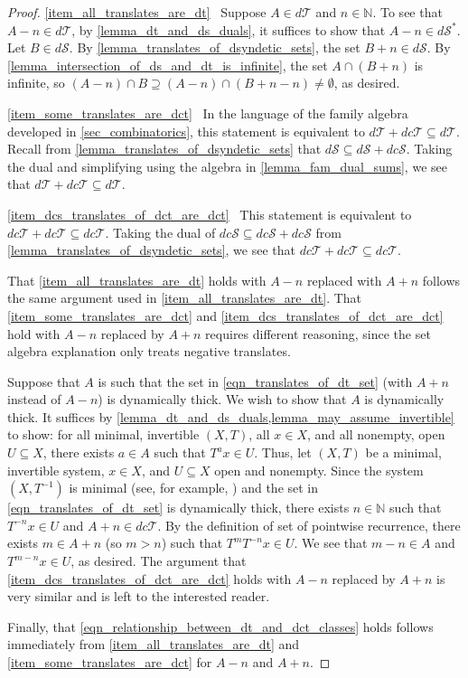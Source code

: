 \documentclass[letter,11pt]{article}
\theoremstyle{plain}
\theoremstyle{definition}
\theoremstyle{plain}
\theoremstyle{plain}
\numberwithin{equation}{section}
\newcommand{\N}{\mathbb{N}}
\newcommand{\dsyndetic}{d\mathcal{S}}
\newcommand{\dthick}{d\mathcal{T}}
\newcommand{\dcsyndetic}{dc\mathcal{S}}
\newcommand{\dcthick}{dc\mathcal{T}}
\begin{document}
\begin{proof}
    \eqref{item_all_translates_are_dt} \ Suppose $A \in \dthick$ and $n \in \N$. To see that $A - n \in \dthick$, by \cref{lemma_dt_and_ds_duals}, it suffices to show that $A-n \in \dsyndetic^*$.  Let $B \in \dsyndetic$.  By \cref{lemma_translates_of_dsyndetic_sets}, the set $B + n \in \dsyndetic$.  By \cref{lemma_intersection_of_ds_and_dt_is_infinite}, the set $A \cap (B+n)$ is infinite, so $(A-n) \cap B \supseteq (A-n) \cap (B+n - n) \neq \emptyset$, as desired.

    \eqref{item_some_translates_are_dct} \ In the language of the family algebra developed in \cref{sec_combinatorics}, this statement is equivalent to $\dthick + \dcthick \subseteq \dthick$.  Recall from \cref{lemma_translates_of_dsyndetic_sets} that $\dsyndetic \subseteq \dsyndetic + \dcsyndetic$. Taking the dual and simplifying using the algebra in \cref{lemma_fam_dual_sums}, we see that $\dthick + \dcthick \subseteq \dthick$.

    \eqref{item_dcs_translates_of_dct_are_dct} \ This statement is equivalent to $\dcthick + \dcthick \subseteq \dcthick$. Taking the dual of $\dcsyndetic \subseteq \dcsyndetic + \dcsyndetic$ from \cref{lemma_translates_of_dsyndetic_sets}, we see that $\dcthick + \dcthick \subseteq \dcthick$.
    
    That \eqref{item_all_translates_are_dt} holds with $A-n$ replaced with $A+n$ follows the same argument used in \eqref{item_all_translates_are_dt}.  That \eqref{item_some_translates_are_dct} and \eqref{item_dcs_translates_of_dct_are_dct} hold with $A-n$ replaced by $A+n$ requires different reasoning, since the set algebra explanation only treats negative translates.

    Suppose that $A$ is such that the set in \eqref{eqn_translates_of_dt_set} (with $A+n$ instead of $A-n$) is dynamically thick.  We wish to show that $A$ is dynamically thick.  It suffices by \cref{lemma_dt_and_ds_duals,lemma_may_assume_invertible} to show: for all minimal, invertible $(X,T)$, all $x \in X$, and all nonempty, open $U \subseteq X$, there exists $a \in A$ such that $T^a x \in U$.  Thus, let $(X,T)$ be a minimal, invertible system, $x \in X$, and $U \subseteq X$ open and nonempty.  Since the system $(X,T^{-1})$ is minimal (see, for example, \cite[Lemma 2.7]{glasscock_koutsogiannis_richter_2019}) and the set in \eqref{eqn_translates_of_dt_set} is dynamically thick, there exists $n \in \N$ such that $T^{-n} x \in U$ and $A + n \in \dcthick$.  By the definition of set of pointwise recurrence, there exists $m \in A+n$ (so $m > n$) such that $T^m T^{-n} x \in U$.  We see that $m - n \in A$ and $T^{m-n} x \in U$, as desired.  The argument that \eqref{item_dcs_translates_of_dct_are_dct} holds with $A-n$ replaced by $A+n$ is very similar and is left to the interested reader.

    Finally, that \eqref{eqn_relationship_between_dt_and_dct_classes} holds follows immediately from \eqref{item_all_translates_are_dt} and \eqref{item_some_translates_are_dct} for $A-n$ and $A+n$.
\end{proof}
\end{document}
